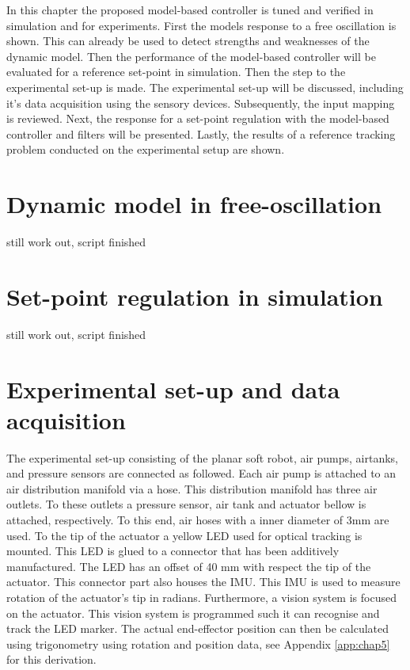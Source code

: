 \label{chap5}

In this chapter the proposed model-based controller is tuned and verified in simulation and for experiments. First the models response to a free oscillation is shown. This can already be used to detect strengths and weaknesses of the dynamic model. Then the performance of the model-based controller will be evaluated for a reference set-point in simulation. Then the step to the experimental set-up is made. The experimental set-up will be discussed, including it's data acquisition using the sensory devices. Subsequently, the input mapping is reviewed. Next, the response for a set-point regulation with the model-based controller and filters will be presented. Lastly, the results of a reference tracking problem conducted on the experimental setup are shown. 



\section{Dynamic model in free-oscillation}

still work out, script finished

\section{Set-point regulation in simulation}

still work out, script finished


\section{Experimental set-up and data acquisition}

The experimental set-up consisting of the planar soft robot, air pumps, airtanks, and pressure sensors are connected as followed. Each air pump is attached to an air distribution manifold via a hose. This distribution manifold has three air outlets. To these outlets a pressure sensor, air tank and actuator bellow is attached, respectively. To this end, air hoses with a inner diameter of 3mm are used. To the tip of the actuator a yellow LED used for optical tracking is mounted. This LED is glued to a connector that has been additively manufactured. The LED has an offset of 40 mm with respect the tip of the actuator. This connector part also houses the IMU. This IMU is used to measure rotation of the actuator's tip in radians. Furthermore, a vision system is focused on the actuator. This vision system is programmed such it can recognise and track the LED marker. The actual end-effector position can then be calculated using trigonometry using rotation and position data, see Appendix \ref{app:chap5} for this derivation. 


